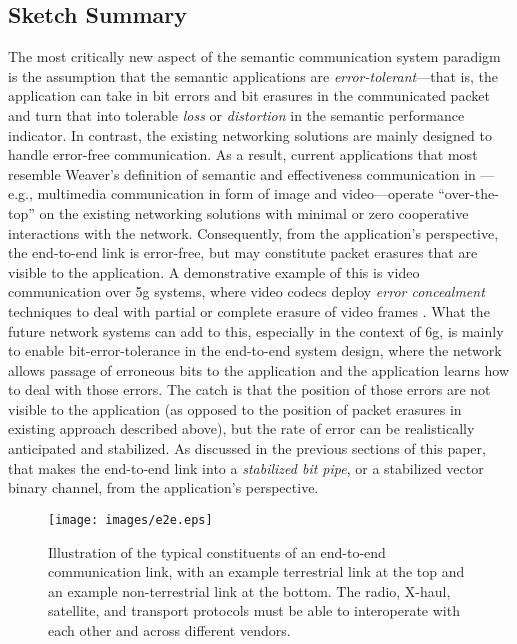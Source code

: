 \subsection{Sketch Summary}
\label{sec:sketch}
The most critically new aspect of the semantic communication system paradigm is the assumption that the semantic applications are \emph{error-tolerant}---that is, the application can take in bit errors and bit erasures in the communicated packet and turn that into tolerable \emph{loss} or \emph{distortion} in the semantic performance indicator. In contrast, the existing networking solutions are mainly designed to handle error-free communication. As a result,  current applications that most resemble  Weaver's definition of semantic and effectiveness communication in \cite{shannon1998mathematical}---e.g., multimedia communication in form of image and video---operate ``over-the-top'' on the existing networking solutions with minimal or zero cooperative interactions with the network. Consequently, from the application's perspective, the end-to-end link is error-free, but may constitute packet  erasures that are visible to the application. A demonstrative example of this is video communication over \gls{5g} systems, where video codecs deploy \emph{error concealment} techniques to deal with partial or complete erasure of video frames \cite{aign1995temporal}.  %
What the future network systems can add to this, especially in the context of \gls{6g}, is mainly to enable bit-error-tolerance in the end-to-end system design, where the network allows passage of erroneous bits to the application and the application learns how to deal with those errors. The catch is that the position  of those errors  are not visible to the application (as opposed to the position of packet erasures in existing approach described above), but the rate of error can be realistically anticipated and stabilized. As discussed in the previous sections of this paper, that makes the end-to-end link into a \emph{stabilized bit pipe}, or a stabilized vector binary channel, from the application's perspective. 




\begin{figure*}[h]
\begin{center}
\texttt{[image: images/e2e.eps]}
\caption{Illustration of the typical constituents of an end-to-end communication link, with an example terrestrial link at the top and an example non-terrestrial link at the bottom. The radio, X-haul, satellite, and transport protocols must be able to interoperate with each other and across different vendors.}
\label{fig:e2e}
\end{center}
\end{figure*}

